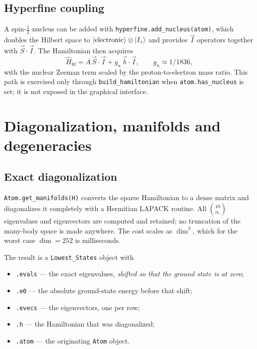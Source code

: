 \documentclass[11pt,a4paper]{article}
\newcommand{\op}[1]{\texttt{#1}}
\begin{document}
\subsection{Hyperfine coupling}

A spin-$\tfrac12$ nucleus can be added with \op{hyperfine.add\_nucleus(atom)},
which doubles the Hilbert space to $|{\rm electronic}\rangle\otimes|I_z\rangle$
and provides $\vec{I}$ operators together with $\vec{S}\cdot\vec{I}$.  The
Hamiltonian then acquires
\begin{equation}
  \hat H_{\mathrm{hf}} = A\,\vec{S}\cdot\vec{I} + g_n\,\vec{b}\cdot\vec{I},
  \qquad g_n \simeq 1/1836 ,
\end{equation}
with the nuclear Zeeman term scaled by the proton-to-electron mass ratio.  This
path is exercised only through \op{build\_hamiltonian} when
\op{atom.has\_nucleus} is set; it is not exposed in the graphical interface.

\section{Diagonalization, manifolds and degeneracies}

\subsection{Exact diagonalization}

\op{Atom.get\_manifolds(H)} converts the sparse Hamiltonian to a dense matrix
and diagonalizes it completely with a Hermitian LAPACK routine.  All
$\binom{10}{n_e}$ eigenvalues and eigenvectors are computed and retained; no
truncation of the many-body space is made anywhere.  The cost scales as
$\dim^3$, which for the worst case $\dim=252$ is milliseconds.

The result is a \op{Lowest\_States} object with
\begin{itemize}
\item \op{.evals} --- the exact eigenvalues, \emph{shifted so that the ground
      state is at zero};
\item \op{.e0} --- the absolute ground-state energy before that shift;
\item \op{.evecs} --- the eigenvectors, one per row;
\item \op{.h} --- the Hamiltonian that was diagonalized;
\item \op{.atom} --- the originating \op{Atom} object.
\end{itemize}
\end{document}
